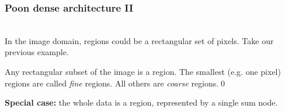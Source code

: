 \documentclass[usenames,dvipsnames]{beamer}
\begin{document}
\begin{frame}
  \frametitle{Poon dense architecture II}

  \begin{example}~\\
    In the image domain, regions could be a rectangular set of pixels. Take our previous example.

    \begin{figure}
      \centering
    \end{figure}

    Any rectangular subset of the image is a region. The smallest (e.g. one pixel) regions are
    called \emph{fine} regions. All others are \emph{coarse} regions.\qed
  \end{example}

  \textbf{Special case:} the whole data is a region, represented by a single sum node.
\end{frame}
\end{document}

